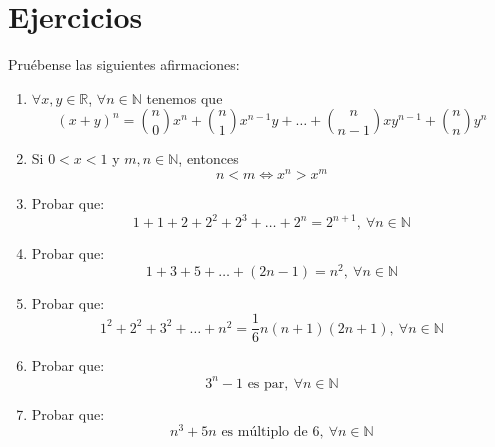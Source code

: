 \section{Ejercicios}
\begin{ejercicio} Pruébense las siguientes afirmaciones:
    \begin{enumerate}
        \item $\forall x,y \in \mathbb{R}$, $\forall n \in \mathbb{N}$ tenemos que
        \begin{equation*}
            (x+y)^n=\binom{n}{0}x^n+\binom{n}{1}x^{n-1}y+\dots+\binom{n}{n-1}x y^{n-1} + \binom{n}{n}y^n
        \end{equation*}

        \item Si $0 < x < 1$ y $m,n \in \mathbb{N}$, entonces
        \begin{equation*}
            n < m \Longleftrightarrow x^n > x^m
        \end{equation*}

        \item Probar que:
        \begin{equation*}
            1+1+2+2^2+2^3+\dots+2^n=2^{n+1}, ~\forall n \in \mathbb{N}
        \end{equation*}

        \item Probar que:
        \begin{equation*}
            1+3+5+\dots+(2n-1)=n^2, ~\forall n \in \mathbb{N}
        \end{equation*}

        \item Probar que:
        \begin{equation*}
            1^2+2^2+3^2 + \dots + n^2 = \frac{1}{6}n(n+1)(2n+1), ~\forall n \in \mathbb{N}
        \end{equation*}

        \item Probar que:
        \begin{equation*}
           3^n -1 \text{ es par}, ~\forall n \in \mathbb{N}
        \end{equation*}

        \item Probar que:
        \begin{equation*}
           n^3+5n \text{ es múltiplo de } 6, ~\forall n \in \mathbb{N}
        \end{equation*}


\end{enumerate}
\end{ejercicio}
